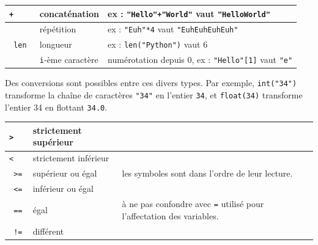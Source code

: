 \documentclass[11pt,a4paper]{article}
\begin{document}
\begin{tcolorbox}[left=0cm,title=\bf{\faPython \; Types de base et opérateurs associés},colbacktitle=cfond]
\begin{itemize}
	\begin{tabularx}{\linewidth}{|>{\tt}l|l|X|}
		\hline
		+ & concaténation & ex : {\tt "Hello"+"World"} vaut {\tt "HelloWorld"}\\
		\hline
		* & répétition & ex : {\tt "Euh"*4} vaut {\tt "EuhEuhEuhEuh"} \\
		\hline
		len & longueur & ex : {\tt len("Python")} vaut 6 \\
		\hline
		[] & {\tt i}-ème caractère & numérotation depuis 0, ex : {\tt "Hello"[1]} vaut {\tt "e"}\\
		\hline
	 \end{tabularx}
\end{itemize}
Des conversions sont possibles entre ces divers types. Par exemple, \texttt{int("34")} transforme la chaîne de caractères {\tt "34"} en l'entier {\tt 34}, et \texttt{float(34)} transforme l'entier 34 en flottant {\tt 34.0}.
\end{tcolorbox}

\begin{tcolorbox}[left=0cm,title=\bf{\faPython \; Comparaison},colbacktitle=cfond]
	\begin{tabularx}{\linewidth}{|>{\tt}l|l|X|}
		\hline
		> & strictement supérieur & \\
		\hline
		< & strictement inférieur & \\
		\hline
		>= & supérieur ou égal & les symboles sont dans l'ordre de leur lecture.\\
		\hline
		<= & inférieur ou égal & \\
		\hline
		== & égal & {\small \danger} à ne pas confondre avec {\tt =} utilisé pour l'affectation des variables.\\
		\hline
		!= & différent & \\
		\hline
	\end{tabularx}
\end{tcolorbox}
\end{document}
